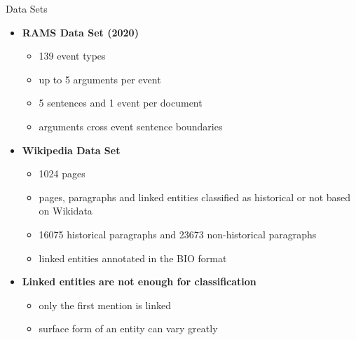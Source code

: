 \documentclass[10pt,aspectratio=1610,professionalfont]{beamer}
\begin{document}
\begin{frame}{Data Sets}
    \begin{itemize}
        \item \textbf{RAMS Data Set (2020)}
        \begin{itemize}
            \item 139 event types
            \item up to 5 arguments per event
            \item 5 sentences and 1 event per document
            \item arguments cross event sentence boundaries 
        \end{itemize}
        
        \item \textbf{Wikipedia Data Set}
        \begin{itemize}
            \item 1024 pages
            \item pages, paragraphs and linked entities classified as historical or not based on Wikidata
            \item 16075 historical paragraphs and 23673 non-historical paragraphs 
            \item linked entities annotated in the BIO format 
        \end{itemize}

        \item \textbf{Linked entities are not enough for classification}
        \begin{itemize}
            \item only the first mention is linked
            \item surface form of an entity can vary greatly
        \end{itemize} 
        
    \end{itemize}
\end{frame}
\end{document}
